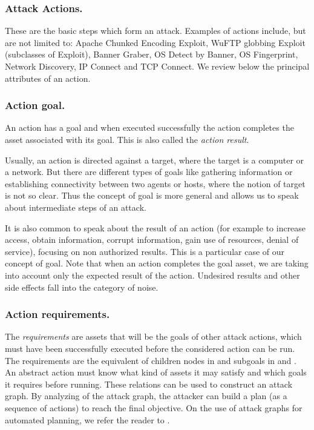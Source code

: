 \documentclass{llncs}
\begin{document}
\subsubsection{Attack Actions.} \label{actions}

These are the basic steps which form an attack.
Examples of actions include, but are not limited to:
Apache Chunked Encoding Exploit, WuFTP globbing Exploit
(subclasses of Exploit), Banner Graber, OS Detect by Banner,
OS Fingerprint, Network Discovery, IP Connect and TCP Connect.
We review below the principal attributes of an action.

\subsubsection{Action goal.}
An action has a goal and when executed successfully the action completes the asset
associated with its goal. This is also called the \emph{action result}.

Usually, an action is directed against a target,
where the target is a computer or a network.
But there are different types of goals like gathering information
or establishing connectivity between two agents or hosts,
where the notion of target is not so clear. Thus the concept
of goal is more general and allows us to speak about intermediate
steps of an attack.

It is also common to speak about the result of an action
(for example to increase access, obtain information, corrupt information, 
gain use of resources, denial of service), focusing on non authorized results.
This is a particular case of our concept of goal.
Note that when an action completes the goal asset,
we are taking into account only the expected result of the action.
Undesired results and other side effects fall into the category of noise.


\subsubsection{Action requirements.}
The {\em requirements} are assets that will be the goals of other attack actions, 
which must have been successfully
executed before the considered action can be run. 
The requirements are the equivalent of children nodes in \cite{Sc00}
and subgoals in \cite{TLK01} and \cite{MEL01}.
An abstract action must know what kind of assets it may satisfy
and which goals it requires before running. These relations can be
used to construct an attack graph. 
By analyzing of the attack graph, the attacker can build a plan 
(as a sequence of actions) to reach the final objective.
On the use of attack graphs for automated planning, we refer the reader to \cite{building}. 
\end{document}
